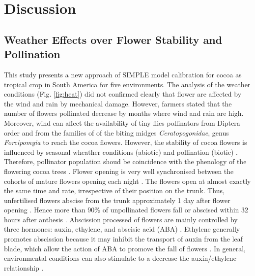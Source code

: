 \documentclass[gene,journal,article,submit,moreauthors,pdftex]{Definitions/mdpi}
\begin{document}

\section{Discussion}

\subsection{Weather Effects over Flower Stability and Pollination}
This study presents a new approach of SIMPLE model calibration for cocoa as tropical crop in South America for five environments. The analysis of the weather conditions (Fig. \ref{fig:heat}) did not confirmed clearly that flower are affected by the wind and rain by mechanical damage. However, farmers stated that the number of flowers pollinated decrease by months where wind and rain are high. Moreover, wind can affect the availability of tiny flies pollinators from Diptera order and from the families of of the biting midges \textit{Ceratopogonidae},  genus  \textit{Forcipomyia} \citep{Saunders1959, kaufmann1975, sotomayor2020} to reach the cocoa flowers. However, the stability of cocoa flowers is influenced by seasonal wheather conditions (abiotic) and pollination (biotic) \citep{Frimpong2014}. Therefore, pollinator population shoud be coincidence with the phenology of the flowering cocoa trees \citep{Young1983, Young2012}. Flower opening is very well synchronised between the cohorts of mature flowers opening each night \citep{Niemenak2010}. The flowers open at almost exactly the same time and rate, irrespective of their position on the trunk. Thus, unfertilised flowers abscise from the trunk approximately 1 day after flower opening  \citep{Niemenak2010}. Hence more than 90\% of unpollinated flowers fall or abscised within 32 hours after  anthesis \citep{Aneja1999}. Abscission processed of  flowers are mainly controlled  by  three  hormones: auxin, ethylene, and abscisic acid (ABA) \citep{Aneja1999}. Ethylene generally promotes abscission because it may  inhibit the transport of auxin from the leaf blade, which allow the action of ABA to promove the fall of flowers \citep{Beyer1975}. In general, environmental conditions can also  stimulate   to  a  decrease  the  auxin/ethylene relationship \citep{Aneja1999}.
\end{document}
